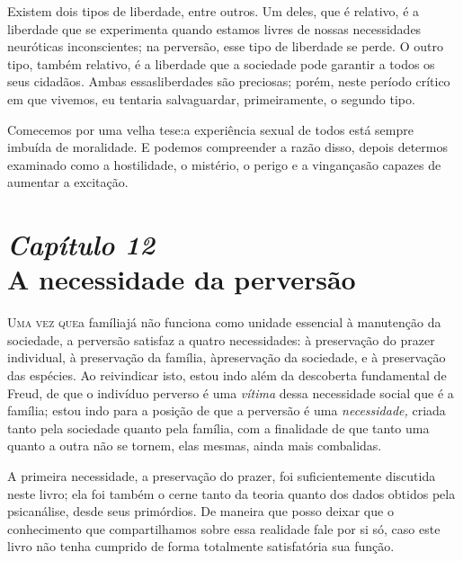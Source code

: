 Existem dois tipos de liberdade, entre outros. Um deles, que é
relativo, é a liberdade que se experimenta quando estamos livres de
nossas necessidades neuróticas inconscientes; na perversão, esse tipo
de liberdade se perde. O outro tipo, também relativo, é a liberdade que
a sociedade pode garantir a todos os seus cidadãos. Ambas essas\idxsexulrep[|)]
liberdades são preciosas; porém, neste período crítico em que vivemos,
eu tentaria salvaguardar, primeiramente, o segundo tipo.\idxsexul[|)]

Comecemos por uma velha tese:\idxsexulres[|)] a experiência sexual de todos está sempre
imbuída de moralidade. E podemos compreender a razão disso, depois de\idxpervdirei[|)]
termos examinado como a hostilidade, o mistério, o perigo e a vingança\idxpecad[|)]
são capazes de aumentar a excitação.



\chapter[\textbf{12}\quad A necessidade da perversão]{{\large\textit{Capítulo 12}}\\ A necessidade da perversão}


\textsc{Uma vez que}\idxpervneces[|(] a família\idxinflu[|(] já não funciona como unidade essencial à
manutenção da sociedade, a perversão satisfaz a quatro necessidades: à
preservação do prazer individual, à preservação da família, à\idxrelpc[|(]
preservação da sociedade, e à preservação das espécies. Ao reivindicar
isto, estou indo além da descoberta fundamental de Freud,\idxfreudperve{} de que o
indivíduo perverso é uma \textit{vítima} dessa necessidade social que é
a família; estou indo para a posição de que a perversão é uma\textit{
necessidade,} criada tanto pela sociedade quanto pela família, com a
finalidade de que tanto uma quanto a outra não se tornem, elas mesmas,
ainda mais combalidas.

A primeira necessidade, a preservação do prazer, foi suficientemente
discutida neste livro; ela foi também o cerne tanto da teoria quanto
dos dados obtidos pela psicanálise, desde seus primórdios. De maneira
que posso deixar que o conhecimento que compartilhamos sobre essa
realidade fale por si só, caso este livro não tenha cumprido de forma
totalmente satisfatória sua função.

